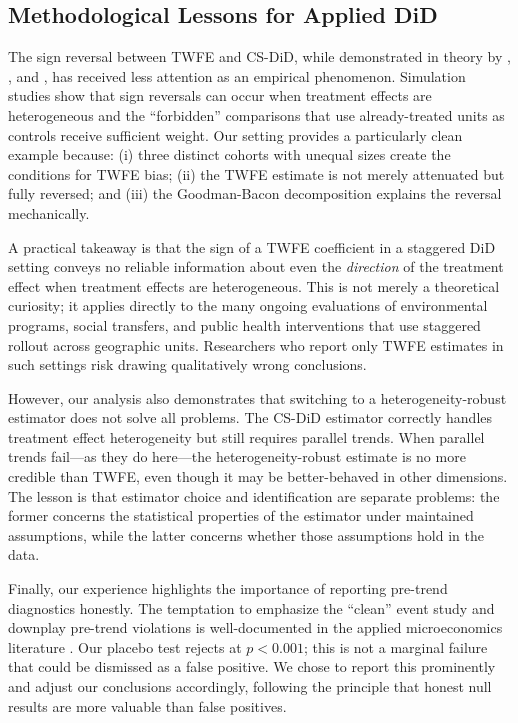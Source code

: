 \documentclass[12pt]{article}
\begin{document}
\subsection{Methodological Lessons for Applied DiD}

The sign reversal between TWFE and CS-DiD, while demonstrated in theory by \citet{goodmanbacon2021difference}, \citet{dechaisemartin2020two}, and \citet{sun2021estimating}, has received less attention as an empirical phenomenon. Simulation studies show that sign reversals can occur when treatment effects are heterogeneous and the ``forbidden'' comparisons that use already-treated units as controls receive sufficient weight. Our setting provides a particularly clean example because: (i) three distinct cohorts with unequal sizes create the conditions for TWFE bias; (ii) the TWFE estimate is not merely attenuated but fully reversed; and (iii) the Goodman-Bacon decomposition explains the reversal mechanically.

A practical takeaway is that the sign of a TWFE coefficient in a staggered DiD setting conveys no reliable information about even the \textit{direction} of the treatment effect when treatment effects are heterogeneous. This is not merely a theoretical curiosity; it applies directly to the many ongoing evaluations of environmental programs, social transfers, and public health interventions that use staggered rollout across geographic units. Researchers who report only TWFE estimates in such settings risk drawing qualitatively wrong conclusions.

However, our analysis also demonstrates that switching to a heterogeneity-robust estimator does not solve all problems. The CS-DiD estimator correctly handles treatment effect heterogeneity but still requires parallel trends. When parallel trends fail---as they do here---the heterogeneity-robust estimate is no more credible than TWFE, even though it may be better-behaved in other dimensions. The lesson is that estimator choice and identification are separate problems: the former concerns the statistical properties of the estimator under maintained assumptions, while the latter concerns whether those assumptions hold in the data.

Finally, our experience highlights the importance of reporting pre-trend diagnostics honestly. The temptation to emphasize the ``clean'' event study and downplay pre-trend violations is well-documented in the applied microeconomics literature \citep{roth2022pretest}. Our placebo test rejects at $p < 0.001$; this is not a marginal failure that could be dismissed as a false positive. We chose to report this prominently and adjust our conclusions accordingly, following the principle that honest null results are more valuable than false positives.
\end{document}
